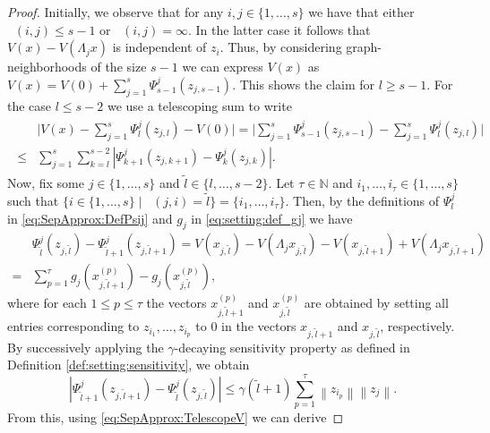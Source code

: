 \documentclass[10pt,a4paper]{amsart}
\DeclareMathOperator{\distG}{\operatorname{dist_\mathcal{G}}} %
\def\N{\mathbb{N}}
\newcommand{\abs}[1]{\left\lvert {#1} \right\rvert}
\newcommand{\agents}{\lbrace 1, \dots, s \rbrace}
\newcommand{\norm}[1]{\left\lVert {#1} \right\rVert}
\begin{document}
\begin{proof}
Initially, we observe that for any $i, j \in \agents$ we have that either $\distG(i,j) \leq s-1 $ or $\distG(i,j) = \infty$. In the latter case it follows that $V(x) - V(\Lambda_j x)$ is independent of $z_i$. Thus, by considering graph-neighborhoods of the size $s-1$ we can express $V(x)$ as 
$V(x) = V(0) + \sum_{j=1}^s \Psi_{s-1}^j(z_{j, s-1})$. This shows the claim for $l \ge s-1$. For the case $l \le s-2$ we use a telescoping sum to write  
\begin{align}       \begin{split}\label{eq:SepApprox:TelescopeV}
        & \Big| {V(x) - \sum_{j=1}^s \Psi_l^j(z_{j,l}) - V(0)}  \Big| =  \Big| {\sum_{j=1}^s \Psi_{s-1}^j(z_{j,s-1}) - \sum_{j=1}^s \Psi_l^j(z_{j,l})}  \Big| \\ \leq & \sum_{j=1}^s \sum_{k = l}^{s-2} \abs{\Psi_{k+1}^j(z_{j,k+1}) - \Psi_{k}^j(z_{j,k})}. 
    \end{split}
\end{align}
Now, fix some $j \in \agents$ and $\tilde{l} \in \{l, \dots, s-2\}$. Let $\tau \in \N$ and $i_1, \dots, i_\tau \in \agents$ such that $\lbrace i \in \agents \mid \distG(j,i) = \tilde l \rbrace = \lbrace i_1, \dots, i_\tau \rbrace $.
Then, by the definitions of $\Psi_l^j$ in \eqref{eq:SepApprox:DefPsij} and $g_j$ in \eqref{eq:setting:def_gj} we have
    \begin{align*}
        & \Psi_{\tilde l}^j(z_{j,{\tilde l}}) -\Psi_{{\tilde l}+1}^j(z_{j,{\tilde l}+1}) = V(x_{j,{\tilde l}}) - V(\Lambda_j x_{j,{\tilde l}}) - V(x_{j,{\tilde l}+1}) + V(\Lambda_j x_{j,{\tilde l}+1}) \\ 
        = &  \sum_{p = 1}^\tau g_j(x_{j, {\tilde l}+1}^{(p)}) - g_j(x_{j, {\tilde l}}^{(p)}), 
    \end{align*}
    where for each $1 \leq p \leq \tau$ the vectors $x_{j, {\tilde l}+1}^{(p)}$ and $x_{j, {\tilde l}}^{(p)}$ are obtained by setting all entries corresponding to $z_{i_1}, \dots, z_{i_p}$ to $0$ in the vectors $x_{j, {\tilde l}+1}$ and $x_{j,{\tilde l}}$, respectively. By successively applying the $\gamma$-decaying sensitivity property as defined in Definition \ref{def:setting:sensitivity}, we obtain
    \begin{equation*}
        \abs{ \Psi_{\tilde l+1}^j(z_{j,\tilde l+1}) -\Psi_{\tilde l}^j(z_{j,\tilde l})} \leq \gamma(\tilde l+1) \sum_{p=1}^\tau \norm{z_{i_p}} \norm{z_j}. 
    \end{equation*}
    From this, using \eqref{eq:SepApprox:TelescopeV} we can derive

\end{proof}
\end{document}
